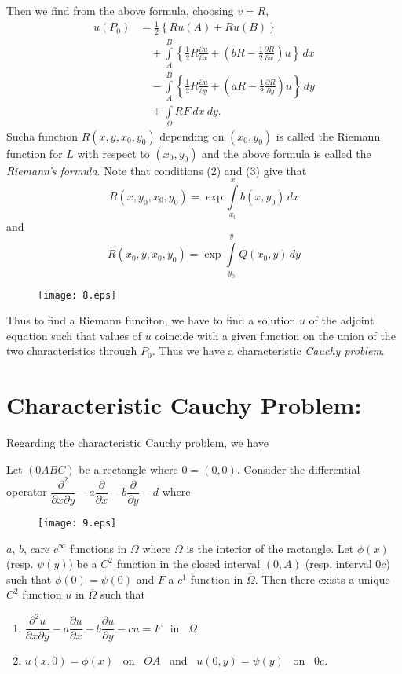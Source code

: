 Then we find from the above formula, choosing $v=R$,
\begin{align*}
u(P_{0}) &= \frac{1}{2}\left\{Ru(A)+Ru(B)\right\}\\[3pt]
         &\quad + \int\limits^{B}_{A}\left\{\frac{1}{2}R\frac{\partial u}{\partial x}+\left(bR-\frac{1}{2}\frac{\partial R}{\partial x}\right)u\right\}\,dx\\[3pt]
&\quad - \int\limits^{B}_{A}\left\{\frac{1}{2}R\frac{\partial u}{\partial y}+\left(aR-\frac{1}{2}\frac{\partial R}{\partial y}\right)u\right\}\,dy\\[3pt]
&\quad + \int\limits_{\Omega} RF \ dx \ dy.
\end{align*}
Such\pageoriginale a function $R(x,y,x_{0},y_{0})$ depending on $(x_{0},y_{0})$ is called the Riemann function for $L$ with respect to $(x_{0},y_{0})$ and the above formula is called the {\em Riemann's formula}. Note that conditions (2) and (3) give that
$$
R(x,y_{0},x_{0},y_{0})=\exp \int\limits^{x}_{x_{0}}b(x,y_{0})\,dx
$$
and
$$
R(x_{0},y,x_{0},y_{0})=\exp \int\limits^{y}_{y_{0}}Q(x_{0},y)\,dy
$$
\begin{figure}[H]
\centering
\texttt{[image: 8.eps]}
\end{figure}
\noindent
Thus to find a Riemann funciton, we have to find a solution $u$ of the adjoint equation such that values of $u$ coincide with a given function on the union of the two characteristics through $P_{0}$. Thus we have a characteristic {\em Cauchy problem}.

\section*{Characteristic Cauchy Problem:}

Regarding the characteristic Cauchy problem, we have

\begin{theorem*}
Let $(0ABC)$ be a rectangle where $0=(0,0)$. Consider the differential operator $\dfrac{\partial^{2}}{\partial x\partial y}-a\dfrac{\partial}{\partial x}-b\dfrac{\partial}{\partial y}-d$ where
\begin{figure}[H]
\centering
\texttt{[image: 9.eps]}
\end{figure}
\noindent
$a$, $b$, $c$\pageoriginale are $c^{\infty}$ functions in $\Omega$ where $\Omega$ is the interior of the ractangle. Let $\phi(x)$ (resp. $\psi(y)$) be a $C^{2}$ function in the closed interval $(0,A)$ (resp. interval $0c$) such that $\phi(0)=\psi(0)$ and $F$ a $c^{1}$ function in $\overline{\Omega}$. Then there exists a unique $C^{2}$ function $u$ in $\overline{\Omega}$ such that
\begin{enumerate}
\renewcommand{\labelenumi}{\rm(\theenumi)}
\item $\dfrac{\partial^{2}u}{\partial x\partial y}-a\dfrac{\partial u}{\partial x}-b\dfrac{\partial u}{\partial y}-cu=F$ \ in \ $\Omega$

\item $u(x,0)=\phi(x)$ \ on \ $OA$ \ and \ $u(0,y)=\psi(y)$ \ on \ $0c$.
\end{enumerate}
\end{theorem*}

